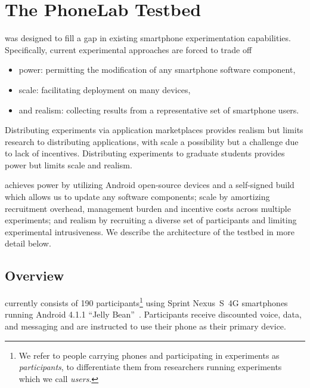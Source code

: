 \section{The PhoneLab Testbed}
\label{sec-testbed}

\PhoneLab{} was designed to fill a gap in existing smartphone experimentation
capabilities. Specifically, current experimental approaches are forced to
trade off

\begin{itemize}[nosep]
\vspace*{0.08in}
\item power: permitting the modification of any smartphone software component,
\item scale: facilitating deployment on many devices,
\item and realism: collecting results from a representative set of smartphone users.
\vspace*{0.08in}
\end{itemize}

Distributing experiments via application marketplaces provides realism but
limits research to distributing applications, with scale a possibility but a
challenge due to lack of incentives. Distributing experiments to graduate
students provides power but limits scale and realism.

\PhoneLab{} achieves power by utilizing Android open-source devices and a
self-signed build which allows us to update any software components; scale by
amortizing recruitment overhead, management burden and incentive costs across
multiple experiments; and realism by recruiting a diverse set of participants
and limiting experimental intrusiveness. We describe the architecture of the
\PhoneLab{} testbed in more detail below.

\subsection{Overview}

\PhoneLab{} currently consists of 190 participants\footnote{We refer to
people carrying \PhoneLab{} phones and participating in experiments as
\PhoneLab{} \textit{participants}, to differentiate them from researchers
running \PhoneLab{} experiments which we call \textit{users}.} using Sprint
Nexus~S~4G smartphones~\cite{nexuss4g} running Android 4.1.1 ``Jelly
Bean''~\cite{jellybean}. Participants receive discounted voice, data,
and messaging and are instructed to use their \PhoneLab{} phone as their
primary device.

